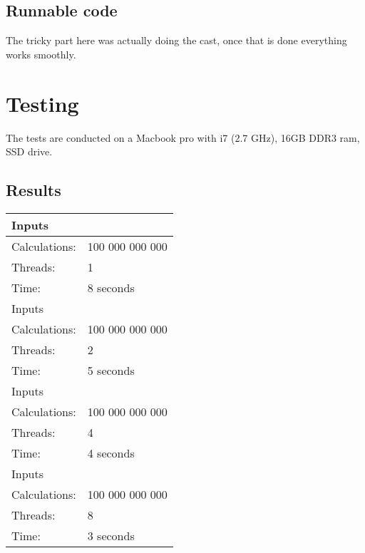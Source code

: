 

\subsection{Runnable code}
The tricky part here was actually doing the cast, once that is done everything works smoothly.




\section{Testing}
The tests are conducted on a Macbook pro with i7 (2.7 GHz), 16GB DDR3 ram, SSD drive.

\subsection{Results}
\newcommand{\row}[3] {
\hline
\rowcolor{gr1}
Inputs&\\
\hline \hline
\rowcolor{gr2}
Calculations: & #1 \\
\hline
\rowcolor{gr2}
Threads: & #2 \\
\hline
\rowcolor{gr2}
Time: & #3 \\
\hline \hline
}

\newcommand{\botrow}[3] {
\hline
\rowcolor{gr1}
Inputs&\\
\hline \hline
\rowcolor{gr2}
N = & #1 \\
\hline
\rowcolor{gr2}
Threads: & #2 \\
\hline
\rowcolor{gr2}
Time: & #3 \\
\hline
}

\begin{table}[ht]
\begin{tabular}{| p{} | p{} |}
\row{100 000 000 000}{1}{8 seconds}
\row{100 000 000 000}{2}{5 seconds}
\row{100 000 000 000}{4}{4 seconds}
\row{100 000 000 000}{8}{3 seconds}
\end{tabular}
\end{table}